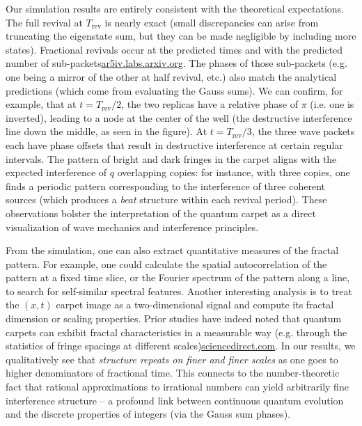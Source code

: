 \documentclass[11pt,a4paper]{article}
\begin{document}
Our simulation results are entirely consistent with the theoretical expectations. The full revival at $T_{\text{rev}}$ is nearly exact (small discrepancies can arise from truncating the eigenstate sum, but they can be made negligible by including more states). Fractional revivals occur at the predicted times and with the predicted number of sub-packets\href{https://ar5iv.labs.arxiv.org/html/1808.09708#:~:text=Apart from the full revival,shall see%2C the wave function}{ar5iv.labs.arxiv.org}. The phases of those sub-packets (e.g. one being a mirror of the other at half revival, etc.) also match the analytical predictions (which come from evaluating the Gauss sums). We can confirm, for example, that at $t=T_{\text{rev}}/2$, the two replicas have a relative phase of $\pi$ (i.e. one is inverted), leading to a node at the center of the well (the destructive interference line down the middle, as seen in the figure). At $t=T_{\text{rev}}/3$, the three wave packets each have phase offsets that result in destructive interference at certain regular intervals. The pattern of bright and dark fringes in the carpet aligns with the expected interference of $q$ overlapping copies: for instance, with three copies, one finds a periodic pattern corresponding to the interference of three coherent sources (which produces a \emph{beat} structure within each revival period). These observations bolster the interpretation of the quantum carpet as a direct visualization of wave mechanics and interference principles.

From the simulation, one can also extract quantitative measures of the fractal pattern. For example, one could calculate the spatial autocorrelation of the pattern at a fixed time slice, or the Fourier spectrum of the pattern along a line, to search for self-similar spectral features. Another interesting analysis is to treat the $(x,t)$ carpet image as a two-dimensional signal and compute its fractal dimension or scaling properties. Prior studies have indeed noted that quantum carpets can exhibit fractal characteristics in a measurable way (e.g. through the statistics of fringe spacings at different scales)\href{https://www.sciencedirect.com/science/article/abs/pii/S0034487724000223#:~:text=QUANTUM REVIVALS AND FRACTALITY FOR,initial data at rational times}{sciencedirect.com}. In our results, we qualitatively see that \emph{structure repeats on finer and finer scales} as one goes to higher denominators of fractional time. This connects to the number-theoretic fact that rational approximations to irrational numbers can yield arbitrarily fine interference structure – a profound link between continuous quantum evolution and the discrete properties of integers (via the Gauss sum phases).
\end{document}
